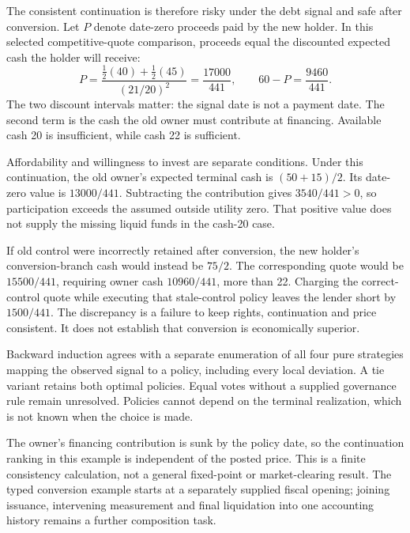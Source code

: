 The consistent continuation is therefore risky under the debt signal and
safe after conversion. Let $P$ denote date-zero proceeds paid by the new
holder. In this selected competitive-quote comparison, proceeds equal the
discounted expected cash the holder will receive:
\begin{equation}
 P=\frac{\tfrac12(40)+\tfrac12(45)}{(21/20)^2}
   =\frac{17000}{441},\qquad
 60-P=\frac{9460}{441}.
 \label{sim:control-dependent-quote}
\end{equation}
The two discount intervals matter: the signal date is not a payment date.
The second term is the cash the old owner must contribute at financing.
Available cash 20 is insufficient, while cash 22 is sufficient.

Affordability and willingness to invest are separate conditions. Under
this continuation, the old owner's expected terminal cash is
$(50+15)/2$. Its date-zero value is $13000/441$. Subtracting the
contribution gives $3540/441>0$, so participation exceeds the assumed
outside utility zero. That positive value does not supply the missing
liquid funds in the cash-20 case.

If old control were incorrectly retained after conversion, the new
holder's conversion-branch cash would instead be $75/2$. The corresponding
quote would be $15500/441$, requiring owner cash $10960/441$, more than
22. Charging the correct-control quote while executing that stale-control
policy leaves the lender short by $1500/441$. The discrepancy is a
failure to keep rights, continuation and price consistent. It does not
establish that conversion is economically superior.

Backward induction agrees with a separate enumeration of all four pure
strategies mapping the observed signal to a policy, including every local
deviation. A tie variant retains both optimal policies. Equal votes without
a supplied governance rule remain unresolved. Policies cannot depend on
the terminal realization, which is not known when the choice is made.

The owner's financing contribution is sunk by the policy date, so the
continuation ranking in this example is independent of the posted price.
This is a finite consistency calculation, not a general fixed-point or
market-clearing result. The typed conversion example starts at a separately
supplied fiscal opening; joining issuance, intervening measurement and final
liquidation into one accounting history remains a further composition task.
